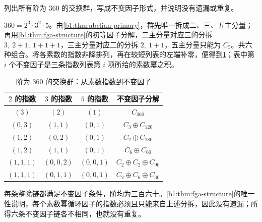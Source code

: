 \begin{exercise}\label{b1:ex:09-order-360}
	列出所有阶为 \(360\) 的交换群，写成不变因子形式，并说明没有遗漏或重复。
\end{exercise}
\begin{solution}
	\(360=2^3\cdot3^2\cdot5\)。由\cref{b1:thm:abelian-primary}，群先唯一拆成二、三、五主分量；再用\cref{b1:thm:fga-structure}的初等因子分解，二主分量对应三的分拆 \(3,\ 2+1,\ 1+1+1\)，三主分量对应二的分拆 \(2,\ 1+1\)，五主分量只能为 \(C_5\)。共六种组合。将各素数的指数非降排列，再在较短列表的左端补零，便得到\cref{b1:tab:order360-invariants}；表中第 \(i\) 个不变因子是三条指数列表第 \(i\) 项所给的素数幂之积。

	\begin{table}[htbp]
		\centering
		\caption{阶为 \(360\) 的交换群：从素数指数到不变因子}
		\label{b1:tab:order360-invariants}
		\begin{tabular}{@{}cccc@{}}
			\toprule
			\(2\) 的指数 & \(3\) 的指数 & \(5\) 的指数 & 不变因子分解 \\
			\midrule
			\((3)\) & \((2)\) & \((1)\) & \(C_{360}\) \\
			\((0,3)\) & \((1,1)\) & \((0,1)\) & \(C_3\oplus C_{120}\) \\
			\((1,2)\) & \((0,2)\) & \((0,1)\) & \(C_2\oplus C_{180}\) \\
			\((1,2)\) & \((1,1)\) & \((0,1)\) & \(C_6\oplus C_{60}\) \\
			\((1,1,1)\) & \((0,0,2)\) & \((0,0,1)\) & \(C_2\oplus C_2\oplus C_{90}\) \\
			\((1,1,1)\) & \((0,1,1)\) & \((0,0,1)\) & \(C_2\oplus C_6\oplus C_{30}\) \\
			\bottomrule
		\end{tabular}
	\end{table}

	每条整除链都满足不变因子条件，阶均为三百六十。\cref{b1:thm:fga-structure}的唯一性说明，每个素数幂循环因子的指数必须且只能来自上述分拆，因此没有遗漏；所得六条不变因子链各不相同，也就没有重复。
\end{solution}

